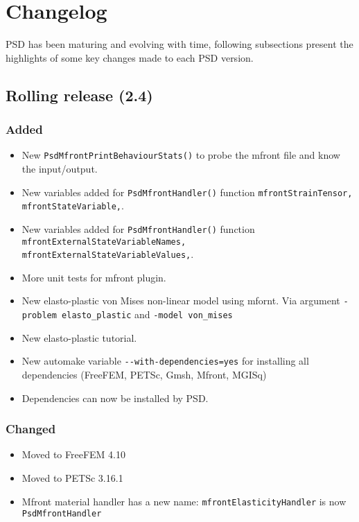 \section{Changelog}

PSD has been maturing and evolving with time, following subsections
present the highlights of some key changes made to each PSD version.

\subsection{Rolling release (2.4)}

\subsubsection{Added}

\begin{itemize}
\tightlist
\item
  New \lstinline!PsdMfrontPrintBehaviourStats()! to probe the mfront
  file and know the input/output.
\item
  New variables added for \lstinline!PsdMfrontHandler()! function
  \lstinline!mfrontStrainTensor, mfrontStateVariable,!.
\item
  New variables added for \lstinline!PsdMfrontHandler()! function
  \lstinline!mfrontExternalStateVariableNames, mfrontExternalStateVariableValues,!.
\item
  More unit tests for mfront plugin.
\item
  New elasto-plastic von Mises non-linear model using mfornt. Via
  argument \lstinline!-problem elasto_plastic! and
  \lstinline!-model von_mises!
\item
  New elasto-plastic tutorial.
\item
  New automake variable \lstinline!--with-dependencies=yes! for
  installing all dependencies (FreeFEM, PETSc, Gmsh, Mfront, MGISq)
\item
  Dependencies can now be installed by PSD.
\end{itemize}

\subsubsection{Changed}

\begin{itemize}
\tightlist
\item
  Moved to FreeFEM 4.10
\item
  Moved to PETSc 3.16.1
\item
  Mfront material handler has a new name:
  \lstinline!mfrontElasticityHandler! is now
  \lstinline!PsdMfrontHandler!
\end{itemize}

